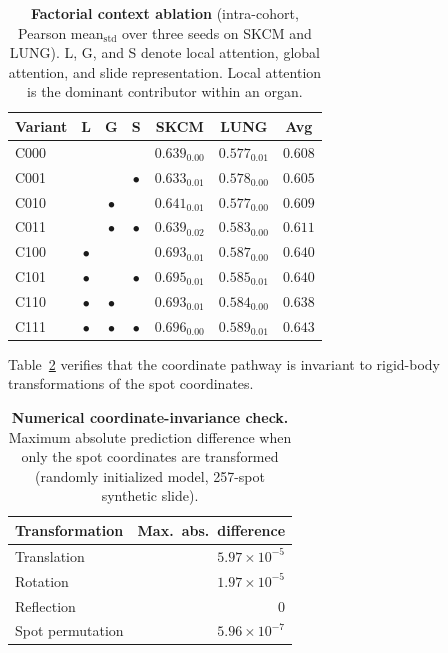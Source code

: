 \documentclass[10pt,twocolumn,letterpaper]{article}
\newcommand{\best}[1]{{\bfseries\boldmath #1}}
\begin{document}
\begin{table}[t]
\centering
\caption{\textbf{Factorial context ablation} (intra-cohort, Pearson mean$_{\text{std}}$ over three
seeds on SKCM and LUNG). L, G, and S denote local attention, global attention, and slide
representation. Local attention is the dominant contributor within an organ.}
\label{tab:ablation}
\small
\setlength{\tabcolsep}{4pt}
\begin{tabular}{l ccc cc c}
\toprule
Variant & L & G & S & SKCM & LUNG & Avg \\
\midrule
C000 & & & & $0.639_{0.00}$ & $0.577_{0.01}$ & $0.608$ \\
C001 & & & $\bullet$ & $0.633_{0.01}$ & $0.578_{0.00}$ & $0.605$ \\
C010 & & $\bullet$ & & $0.641_{0.01}$ & $0.577_{0.00}$ & $0.609$ \\
C011 & & $\bullet$ & $\bullet$ & $0.639_{0.02}$ & $0.583_{0.00}$ & $0.611$ \\
C100 & $\bullet$ & & & $0.693_{0.01}$ & $0.587_{0.00}$ & $0.640$ \\
C101 & $\bullet$ & & $\bullet$ & $0.695_{0.01}$ & $0.585_{0.01}$ & $0.640$ \\
C110 & $\bullet$ & $\bullet$ & & $0.693_{0.01}$ & $0.584_{0.00}$ & $0.638$ \\
C111 & $\bullet$ & $\bullet$ & $\bullet$ & \best{$0.696_{0.00}$} & \best{$0.589_{0.01}$} & \best{$0.643$} \\
\bottomrule
\end{tabular}
\end{table}

Table~\ref{tab:invariance} verifies that the coordinate pathway is invariant to rigid-body transformations of the spot coordinates.

\begin{table}[t]
\centering
\caption{\textbf{Numerical coordinate-invariance check.} Maximum absolute prediction difference when only the spot coordinates are transformed (randomly initialized model, 257-spot synthetic slide).}
\label{tab:invariance}
\small
\begin{tabular}{l r}
\toprule
Transformation & Max.\ abs.\ difference \\
\midrule
Translation & $5.97\times10^{-5}$ \\
Rotation    & $1.97\times10^{-5}$ \\
Reflection  & $0$ \\
Spot permutation & $5.96\times10^{-7}$ \\
\bottomrule
\end{tabular}
\end{table}
\end{document}
